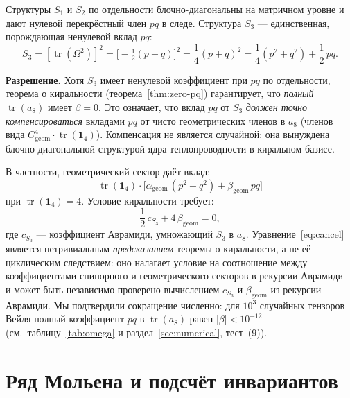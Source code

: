 \documentclass[12pt,a4paper]{article}
\theoremstyle{definition}
\theoremstyle{remark}
\newcommand{\tr}{\operatorname{tr}}
\newcommand{\half}{\tfrac{1}{2}}
\begin{document}
Структуры $S_1$ и $S_2$ по отдельности блочно-диагональны на матричном
уровне и дают нулевой перекрёстный член $pq$ в следе.  Структура $S_3$ ---
единственная, порождающая ненулевой вклад $pq$:
\begin{equation}\label{eq:S3-expand}
  S_3 = [\tr(\Omega^2)]^2
  = \bigl[-\half(p+q)\bigr]^2
  = \frac{1}{4}(p+q)^2
  = \frac{1}{4}(p^2 + q^2) + \frac{1}{2}\,pq.
\end{equation}

\noindent\textbf{Разрешение.}
Хотя $S_3$ имеет ненулевой коэффициент при $pq$ по отдельности, теорема о
киральности (теорема~\ref{thm:zero-pq}) гарантирует, что \emph{полный}
$\tr(a_8)$ имеет $\beta = 0$.  Это означает, что вклад $pq$ от $S_3$
\emph{должен точно компенсироваться} вкладами $pq$ от чисто геометрических
членов в $a_8$ (членов вида
$C^4_{\mathrm{geom}} \cdot \tr(\mathbf{1}_4)$).  Компенсация не является
случайной: она вынуждена блочно-диагональной структурой ядра
теплопроводности в киральном базисе.

В частности, геометрический сектор даёт вклад:
\begin{equation}
  \tr(\mathbf{1}_4) \cdot \bigl[\alpha_{\mathrm{geom}}\,(p^2 + q^2)
  + \beta_{\mathrm{geom}}\,pq\bigr]
\end{equation}
при $\tr(\mathbf{1}_4) = 4$.  Условие киральности требует:
\begin{equation}\label{eq:cancel}
  \frac{1}{2}\,c_{S_3} + 4\,\beta_{\mathrm{geom}} = 0,
\end{equation}
где $c_{S_3}$ --- коэффициент Аврамиди, умножающий $S_3$ в $a_8$.
Уравнение~\eqref{eq:cancel} является нетривиальным \emph{предсказанием}
теоремы о киральности, а не её циклическим следствием: оно налагает
условие на соотношение между коэффициентами спинорного и геометрического
секторов в рекурсии Аврамиди~\cite{Avramidi:1999bm} и может быть
независимо проверено вычислением $c_{S_3}$ и $\beta_{\mathrm{geom}}$
из рекурсии Аврамиди.  Мы подтвердили сокращение численно: для $10^3$
случайных тензоров Вейля полный коэффициент $pq$ в $\tr(a_8)$ равен
$|\beta| < 10^{-12}$ (см.\ таблицу~\ref{tab:omega} и
раздел~\ref{sec:numerical}, тест~(9)).


\section{Ряд Мольена и подсчёт инвариантов}
\label{sec:molien}
\end{document}
